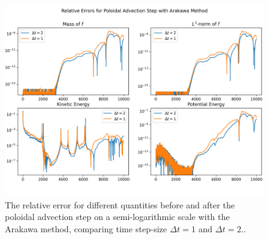 \begin{figure}
	\centering
	\includegraphics[width=0.9\linewidth]{plots/rel_err_log akw}
	\caption{The relative error for different quantities before and after the poloidal advection step on a semi-logarithmic scale with the Arakawa method, comparing time step-size $\Delta t = 1$ and $\Delta t = 2$..}
	\label{fig:relerrlog_akw}
\end{figure}



